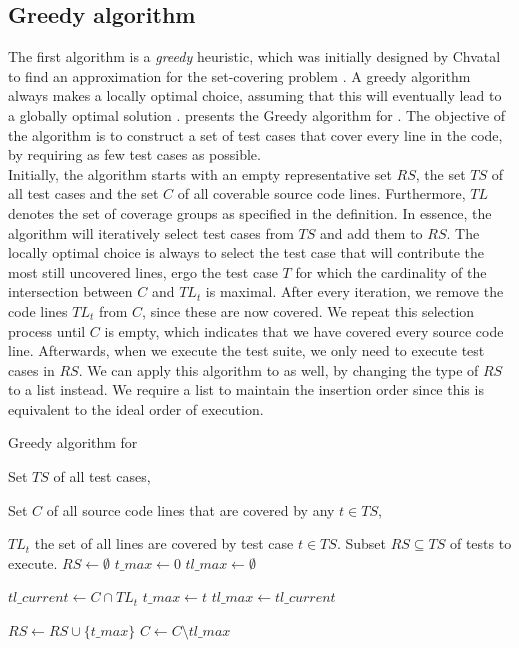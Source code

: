 
\subsection{Greedy algorithm}\label{ssec:alg-greedy}
The first algorithm is a \emph{greedy} heuristic, which was initially designed by Chvatal to find an approximation for the set-covering problem \cite{evaluationoftestsuiteminimization}. A greedy algorithm always makes a locally optimal choice, assuming that this will eventually lead to a globally optimal solution \cite{10.5555/1614191}.  presents the Greedy algorithm for \tsm{}. The objective of the algorithm is to construct a set of test cases that cover every line in the code, by requiring as few test cases as possible.\\

\noindent Initially, the algorithm starts with an empty representative set $RS$, the set $TS$ of all test cases and the set $C$ of all coverable source code lines. Furthermore, $TL$ denotes the set of coverage groups as specified in the definition. In essence, the algorithm will iteratively select test cases from $TS$ and add them to $RS$. The locally optimal choice is always to select the test case that will contribute the most still uncovered lines, ergo the test case $T$ for which the cardinality of the intersection between $C$ and $TL_t$ is maximal. After every iteration, we remove the code lines $TL_t$ from $C$, since these are now covered. We repeat this selection process until $C$ is empty, which indicates that we have covered every source code line. Afterwards, when we execute the test suite, we only need to execute test cases in $RS$. We can apply this algorithm to \tcp{} as well, by changing the type of $RS$ to a list instead. We require a list to maintain the insertion order since this is equivalent to the ideal order of execution.

\begin{algorithm}[h!]
\caption{Greedy algorithm for \tsm{}}
\label{alg:tsm-greedy}
\begin{algorithmic}[1]
	 Set $TS$ of all test cases,
	
	Set $C$ of all source code lines that are covered by any $t \in TS$,
	
	$TL_t$ the set of all lines are covered by test case $t \in TS$.
	 Subset $RS \subseteq TS$ of tests to execute.
	\State $RS \gets \emptyset$
		\State $t\_max \gets 0$
		\State $tl\_max \gets \emptyset$
		
			\State $tl\_current \gets C \cap TL_t$
				\State $t\_max \gets t$
				\State $tl\_max \gets tl\_current$
			\EndIf
		\EndFor
		
		\State $RS \gets RS \cup \{t\_max\}$
		\State $C \gets C \setminus tl\_max$
	\EndWhile
\end{algorithmic}
\end{algorithm}
